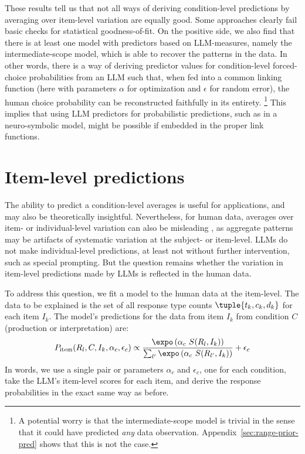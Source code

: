 \documentclass{article}
\begin{document}
These results tell us that not all ways of deriving condition-level predictions by averaging over item-level variation are equally good.
Some approaches clearly fail basic checks for statistical goodness-of-fit.
On the positive side, we also find that there is at least one model with predictors based on LLM-measures, namely the intermediate-scope model, which is able to recover the patterns in the data.
In other words, there is a way of deriving predictor values for condition-level forced-choice probabilities from an LLM such that, when fed into a common linking function (here with parameters $\alpha$ for optimization and $\epsilon$ for random error), the human choice probability can be reconstructed faithfully in its entirety. \footnote{
  A potential worry is that the intermediate-scope model is trivial in the sense that it could have predicted \emph{any} data observation.
  Appendix~\ref{sec:range-prior-pred} shows that this is not the case.
}
This implies that using LLM predictors for probabilistic predictions, such as in a neuro-symbolic model, might be possible if embedded in the proper link functions.


\section{Item-level predictions}
\label{sec:item-level-pred}

The ability to predict a condition-level averages is useful for applications, and may also be theoretically insightful.
Nevertheless, for human data, averages over item- or individual-level variation can also be misleading \citep[e.g.,][]{StanovichWest2000:Individual-diff,EstesMaddox2005:Risks-of-Drawin,HaafRouder2019:Some-do-and-som}, as aggregate patterns may be artifacts of systematic variation at the subject- or item-level.
LLMs do not make individual-level predictions, at least not without further intervention, such as special prompting.
But the question remains whether the variation in item-level predictions made by LLMs is reflected in the human data.

To address this question, we fit a model to the human data at the item-level.
The data to be explained is the set of all response type counts $\tuple{t_{k}, c_{k}, d_{k}}$ for each item $I_{k}$.
The model's predictions for the data from item $I_{k}$ from condition $C$ (production or interpretation) are:
%
\begin{align*}
  P_{\text{item}}(R_{l}, C, I_{k}, \alpha_{c}, \epsilon_{c}) \propto \frac{\expo \left( \alpha_{c} \ S(R_{l}, I_{k}) \right )}{ \sum_{l'} \expo \left( \alpha_{c} \ S(R_{l'}, I_{k}) \right )} + \epsilon_{c}
\end{align*}
%
In words, we use a single pair or parameters $\alpha_{c}$ and $\epsilon_{c}$, one for each condition, take the LLM's item-level scores for each item, and derive the response probabilities in the exact same way as before.
\end{document}
